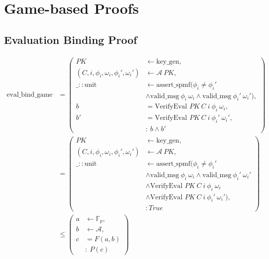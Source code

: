 \chapter{Game-based Proofs}\label{appendix:security}

\section{Evaluation Binding Proof}
\begin{equation*}
    \begin{aligned}
        \text{eval\_bind\_game}&=\left(
        \begin{aligned}
            PK & \leftarrow \text{key\_gen}, \\
            (C, i,\phi_i,\omega_i, \phi_i',\omega_i') & \leftarrow \mathcal{A} \ PK, \\
            \_::\text{unit} & \leftarrow \text{assert\_spmf}(\phi_i \ne \phi_i' \\
            &\land \text{valid\_msg}\ \phi_i\ \omega_i \land \text{valid\_msg}\ \phi_i'\ \omega_i'), \\
            b &= \text{VerifyEval } PK\ C\ i\ \phi_i\ \omega_i,\\
            b' &= \text{VerifyEval } PK\ C\ i\ \phi_i'\ \omega_i',\\
            & : \ b \land b'
        \end{aligned}
        \right)\\
        &= \left(
            \begin{aligned}
                PK & \leftarrow \text{key\_gen}, \\
                (C, i,\phi_i,\omega_i, \phi_i',\omega_i') & \leftarrow \mathcal{A} \ PK, \\
                \_::\text{unit} & \leftarrow \text{assert\_spmf}(\phi_i \ne \phi_i' \\
                &\land \text{valid\_msg}\ \phi_i\ \omega_i \land \text{valid\_msg}\ \phi_i'\ \omega_i' \\
                &\land \text{VerifyEval } PK\ C\ i\ \phi_i\ \omega_i\\
                &\land \text{VerifyEval } PK\ C\ i\ \phi_i'\ \omega_i'),\\
                & : True
            \end{aligned}
            \right)\\
        &\le \left(
            \begin{aligned}
                a & \leftarrow \mathbb{F}_p, \\
                b & \leftarrow \mathcal{A}, \\
                c & = F(a,b) \\
                & : \ P(c)
            \end{aligned}
            \right)
    \end{aligned}
\end{equation*}